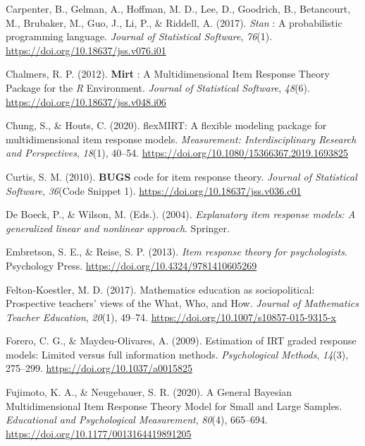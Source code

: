 \documentclass[
  man,
  floatsintext,
  longtable,
  nolmodern,
  notxfonts,
  notimes,
  colorlinks=true,linkcolor=blue,citecolor=blue,urlcolor=blue]{apa7}
\newlength{\cslhangindent}
\newenvironment{CSLReferences}[2] %
 {\begin{list}{}{%
  \setlength{\itemindent}{0pt}
  \setlength{\leftmargin}{0pt}
  \setlength{\parsep}{0pt}
  \ifodd #1
   \setlength{\leftmargin}{\cslhangindent}
   \setlength{\itemindent}{-1\cslhangindent}
  \fi
  \setlength{\itemsep}{#2\baselineskip}}}
 {\end{list}}
\begin{document}
\begin{CSLReferences}{1}{0}
Carpenter, B., Gelman, A., Hoffman, M. D., Lee, D., Goodrich, B.,
Betancourt, M., Brubaker, M., Guo, J., Li, P., \& Riddell, A. (2017).
{\emph{Stan}} : A probabilistic programming language. \emph{Journal of
Statistical Software}, \emph{76}(1).
\url{https://doi.org/10.18637/jss.v076.i01}

Chalmers, R. P. (2012). {\textbf{Mirt}} : {A Multidimensional Item
Response Theory Package} for the {\emph{R}} {Environment}. \emph{Journal
of Statistical Software}, \emph{48}(6).
\url{https://doi.org/10.18637/jss.v048.i06}

Chung, S., \& Houts, C. (2020). {flexMIRT}: A flexible modeling package
for multidimensional item response models. \emph{Measurement:
Interdisciplinary Research and Perspectives}, \emph{18}(1), 40--54.
\url{https://doi.org/10.1080/15366367.2019.1693825}

Curtis, S. M. (2010). {\textbf{BUGS}} code for item response theory.
\emph{Journal of Statistical Software}, \emph{36}(Code Snippet 1).
\url{https://doi.org/10.18637/jss.v036.c01}

De Boeck, P., \& Wilson, M. (Eds.). (2004). \emph{Explanatory item
response models: A generalized linear and nonlinear approach}. Springer.

Embretson, S. E., \& Reise, S. P. (2013). \emph{Item response theory for
psychologists}. Psychology Press.
\url{https://doi.org/10.4324/9781410605269}

Felton-Koestler, M. D. (2017). Mathematics education as sociopolitical:
{Prospective} teachers' views of the {What}, {Who}, and {How}.
\emph{Journal of Mathematics Teacher Education}, \emph{20}(1), 49--74.
\url{https://doi.org/10.1007/s10857-015-9315-x}

Forero, C. G., \& Maydeu-Olivares, A. (2009). Estimation of {IRT} graded
response models: {Limited} versus full information methods.
\emph{Psychological Methods}, \emph{14}(3), 275--299.
\url{https://doi.org/10.1037/a0015825}

Fujimoto, K. A., \& Neugebauer, S. R. (2020). A {General Bayesian
Multidimensional Item Response Theory Model} for {Small} and {Large
Samples}. \emph{Educational and Psychological Measurement},
\emph{80}(4), 665--694. \url{https://doi.org/10.1177/0013164419891205}


\end{CSLReferences}
\end{document}
